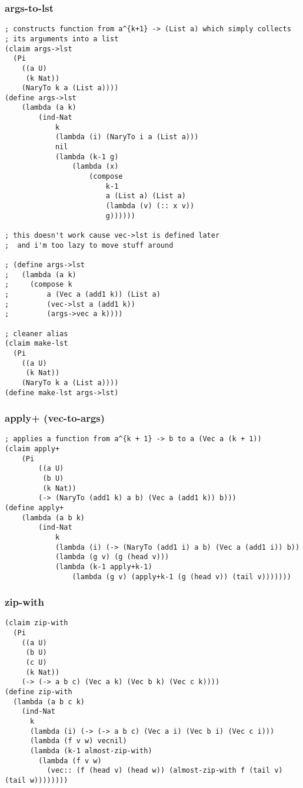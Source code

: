 \subsubsection{args-to-lst} \label{code:args-to-lst}
\begin{lstlisting}
; constructs function from a^{k+1} -> (List a) which simply collects 
; its arguments into a list
(claim args->lst
  (Pi 
    ((a U) 
     (k Nat)) 
    (NaryTo k a (List a))))
(define args->lst
    (lambda (a k)
        (ind-Nat
            k
            (lambda (i) (NaryTo i a (List a)))
            nil
            (lambda (k-1 g)
                (lambda (x)
                    (compose
                        k-1
                        a (List a) (List a)
                        (lambda (v) (:: x v))
                        g))))))

; this doesn't work cause vec->lst is defined later
;  and i'm too lazy to move stuff around

; (define args->lst
;   (lambda (a k) 
;     (compose k 
;         a (Vec a (add1 k)) (List a) 
;         (vec->lst a (add1 k)) 
;         (args->vec a k))))

; cleaner alias
(claim make-lst
  (Pi 
    ((a U) 
     (k Nat)) 
    (NaryTo k a (List a))))
(define make-lst args->lst)
\end{lstlisting}

\subsubsection{apply+ (vec-to-args)} \label{code:apply+}
\begin{lstlisting}
; applies a function from a^{k + 1} -> b to a (Vec a (k + 1))
(claim apply+
    (Pi
        ((a U)
         (b U)
         (k Nat))
        (-> (NaryTo (add1 k) a b) (Vec a (add1 k)) b)))
(define apply+
    (lambda (a b k)
        (ind-Nat
            k
            (lambda (i) (-> (NaryTo (add1 i) a b) (Vec a (add1 i)) b))
            (lambda (g v) (g (head v)))
            (lambda (k-1 apply+k-1)
                (lambda (g v) (apply+k-1 (g (head v)) (tail v)))))))
\end{lstlisting}

\subsubsection{zip-with} \label{code:zip-with}
\begin{lstlisting}
(claim zip-with
  (Pi
    ((a U)
     (b U)
     (c U)
     (k Nat))
    (-> (-> a b c) (Vec a k) (Vec b k) (Vec c k))))
(define zip-with
  (lambda (a b c k)
    (ind-Nat
      k
      (lambda (i) (-> (-> a b c) (Vec a i) (Vec b i) (Vec c i)))
      (lambda (f v w) vecnil)
      (lambda (k-1 almost-zip-with)
        (lambda (f v w)
          (vec:: (f (head v) (head w)) (almost-zip-with f (tail v) (tail w))))))))
\end{lstlisting}

